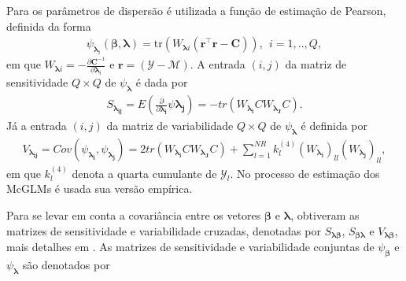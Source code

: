 Para os parâmetros de dispersão é utilizada a função de estimação de
Pearson, definida da forma
    \begin{equation}
    \label{eq:pearson}
      \begin{aligned}
        \psi_{\boldsymbol{\lambda}_i}(\boldsymbol{\beta},
        \boldsymbol{\lambda}) =
        \mathrm{tr}(W_{\boldsymbol{\lambda}i}
          (\boldsymbol{r}^\top\boldsymbol{r} -
          \boldsymbol{C})), \: \: i = 1,.., Q, 
    \end{aligned}
\end{equation}
\noindent em que $W_{\boldsymbol{\lambda}i} = -\frac{\partial
    \boldsymbol{C}^{-1}}{\partial \boldsymbol{\lambda}_i}$ e
    $\boldsymbol{r} = (\mathcal{Y} - \mathcal{M})$. A entrada $(i,j)$ da matriz de sensitividade $Q \times Q$ de $\psi_{\boldsymbol{\lambda}}$ é
dada por
\begin{equation}
      \begin{aligned}
S_{\boldsymbol{\lambda_{ij}}} = E \left (\frac{\partial }{\partial \boldsymbol{\lambda_{i}}} \psi \boldsymbol{\lambda_{j}}\right) = -tr(W_{\boldsymbol{\lambda_{i}}} CW_{\boldsymbol{\lambda_{J}}} C).
    \end{aligned}
\end{equation}
\noindent Já a entrada $(i,j)$ da matriz de variabilidade $Q \times Q$ de $\psi_{\boldsymbol{\lambda}}$ é definida por
\begin{equation}
      \begin{aligned}
V_{\boldsymbol{\lambda_{ij}}} = Cov\left ( \psi_{\boldsymbol{\lambda_{i}}}, \psi_{\boldsymbol{\lambda_{j}}} \right) = 2tr(W_{\boldsymbol{\lambda_{i}}} CW_{\boldsymbol{\lambda_{J}}} C) + \sum_{l=1}^{NR} k_{l}^{(4)} (W_{\boldsymbol{\lambda_{i}}})_{ll} (W_{\boldsymbol{\lambda_{j}}})_{ll},
    \end{aligned}
\end{equation}
\noindent em que $k_{l}^{(4)}$ denota a quarta cumulante de $\mathcal{Y}_{l}$. No processo de estimação dos McGLMs é usada sua versão empírica.

Para se levar em conta a covariância entre os vetores $\boldsymbol{\beta}$
e $\boldsymbol{\lambda}$, \citet{Bonat16} obtiveram as matrizes de 
sensitividade e variabilidade cruzadas, denotadas por $S_{\boldsymbol{\lambda \beta}}$, $S_{\boldsymbol{\beta \lambda}}$ e $V_{\boldsymbol{\lambda \beta}}$, mais detalhes em \citet{Bonat16}. As matrizes de sensitividade e variabilidade conjuntas de $\psi_{\boldsymbol{\beta}}$ e $\psi_{\boldsymbol{\lambda}}$ são denotados por

